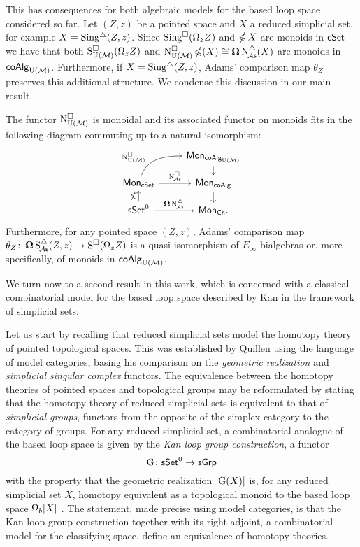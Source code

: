 This has consequences for both algebraic models for the based loop space considered so far.
Let $(Z,z)$ be a pointed space and $X$ a reduced simplicial set, for example $X = \operatorname{Sing^{\triangle}}(Z,z)$.
Since $\operatorname{Sing^{\square}}(\Omega_z Z)$ and $\operatorname{\mathbb{\Omega}} X$ are monoids in $\mathsf{cSet}$ we have that both $\operatorname{S^{\square}_{{\operatorname{U}(\mathcal{M})}}}(\Omega_z Z)$ and $\operatorname{N^{\square}_{{\operatorname{U}(\mathcal{M})}}} \operatorname{\mathbb{\Omega}}(X) \cong \operatorname{\mathbf{\Omega}} \operatorname{N^{\triangle}_{\!{\mathcal{A}\mathsf{s}}}}(X)$ are monoids in $\mathsf{coAlg}_{\operatorname{U}(\mathcal{M})}$.
Furthermore, if $X = \operatorname{Sing^{\triangle}}(Z,z)$, Adams' comparison map $\theta_Z$ preserves this additional structure.
We condense this discussion in our main result.

\begin{theorem} \label{t:1st main thm in the intro}
	The functor $\operatorname{N^{\square}_{{\operatorname{U}(\mathcal{M})}}}$ is monoidal and its associated functor on monoids fits in the following diagram commuting up to a natural isomorphism:
	\[
	\begin{tikzcd} [row sep=small]
	& \Mon_{\coAlg_\UM} \arrow[d] \\
	\Mon_{\cSet} \arrow[ru, "\cchainsUM", out=70, in=180, near start] \arrow[r, "\cchainsA"]
	& \Mon_{\coAlg} \arrow[d] \\
	\sSet^0 \arrow[r, "\cobar \schainsA"] \arrow[u, "\ccobar"]
	& \Mon_{\Ch}.
	\end{tikzcd}
	\]
Furthermore, for any pointed space $(Z,z)$, Adams' comparison map $\theta_Z \colon \operatorname{\mathbf{\Omega}} \operatorname{S^{\triangle}_{\!{\mathcal{A}\mathsf{s}}}}(Z,z) \to \operatorname{S^{\square}}(\Omega_z Z)$ is a quasi-isomorphism of $E_{\infty}$-bialgebras or, more specifically, of monoids in $\mathsf{coAlg}_{\operatorname{U}(\mathcal{M})}$.
\end{theorem}

We turn now to a second result in this work, which is concerned with a classical combinatorial model for the based loop space described by Kan in the framework of simplicial sets.

Let us start by recalling that reduced simplicial sets model the homotopy theory of pointed topological spaces.
This was established by Quillen using the language of model categories, basing his comparison on the \textit{geometric realization} and \textit{simplicial singular complex} functors.
The equivalence between the homotopy theories of pointed spaces and topological groups may be reformulated by stating that the homotopy theory of reduced simplicial sets is equivalent to that of \textit{simplicial groups}, functors from the opposite of the simplex category to the category of groups.
For any reduced simplicial set, a combinatorial analogue of the based loop space is given by the \textit{Kan loop group construction}, a functor
\[
\operatorname{G} \colon \mathsf{sSet}^0 \to \mathsf{sGrp}
\]
with the property that the geometric realization $\lvert\operatorname{G}(X)\rvert$ is, for any reduced simplicial set $X$, homotopy equivalent as a topological monoid to the based loop space $\Omega_b \lvert X\rvert$ \cite{berger1995loops}.
The statement, made precise using model categories, is that the Kan loop group construction together with its right adjoint, a combinatorial model for the classifying space, define an equivalence of homotopy theories.

